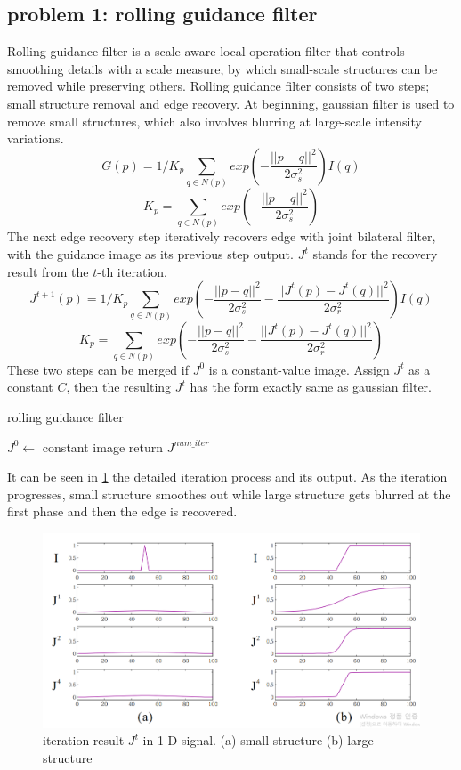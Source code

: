 \documentclass[extendedabs]{bmvc2k}
\begin{document}
\subsection*{problem 1: rolling guidance filter}

Rolling guidance filter \cite{rolling} is a scale-aware local operation filter that controls smoothing
details with a scale measure, by which small-scale structures can be removed while preserving others.
Rolling guidance filter consists of two steps; small structure removal and edge recovery.
At beginning, gaussian filter is used to remove small structures, which also involves blurring at
large-scale intensity variations.
\[G(p) = 1/K_p\sum_{q \in N(p)}exp(-\frac{||p-q||^2}{2\sigma_s^2})I(q)\]
\[K_p = \sum_{q \in N(p)}exp(-\frac{||p-q||^2}{2\sigma_s^2})\]
The next edge recovery step iteratively recovers edge with joint bilateral filter, with the guidance
image as its previous step output. $J^t$ stands for the recovery result from the $t$-th iteration.
\[J^{t+1}(p) = 1/K_p\sum_{q \in N(p)}exp(-\frac{||p-q||^2}{2\sigma_s^2}-\frac{||J^t(p)-J^t(q)||^2}{2\sigma_r^2})I(q)\]
\[K_p = \sum_{q \in N(p)}exp(-\frac{||p-q||^2}{2\sigma_s^2}-\frac{||J^t(p)-J^t(q)||^2}{2\sigma_r^2})\]
These two steps can be merged if $J^0$ is a constant-value image. Assign $J^t$ as a constant $C$, then
the resulting $J^t$ has the form exactly same as gaussian filter.

\begin{algorithm}
\caption{rolling guidance filter}
    $J^0 \gets$ constant image\;
    return $J^{num\_iter}$\;
\end{algorithm}

It can be seen in \figurename{\ref{fig:2}} the detailed iteration process and its output.
As the iteration progresses, small structure smoothes out while large structure gets blurred
at the first phase and then the edge is recovered.
\begin{figure}[h]
    \centering
    \includegraphics[width=\linewidth]{hw2_1_2}
    \caption{iteration result $J^t$ in 1-D signal. (a) small structure (b) large structure}
    \label{fig:2}
\end{figure}
\end{document}
